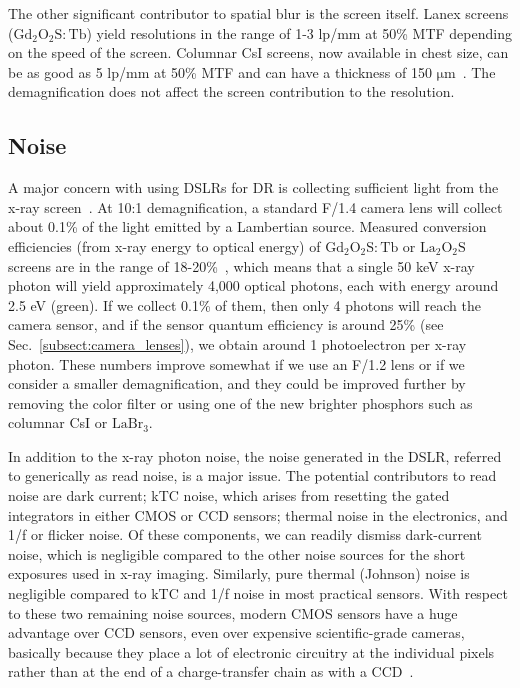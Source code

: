 The other significant contributor to spatial blur is the screen itself. Lanex screens ($\mathrm{Gd_2O_2S:Tb}$) yield resolutions in the range of 1-3 lp/mm at 50\% MTF depending on the speed of the screen. Columnar CsI screens, now available in chest size, can be as good as 5 lp/mm at 50\% MTF and can have a thickness of 150 $\mathrm{\mu m}$~\citep{Nagarkar1997}. The demagnification does not affect the screen contribution to the resolution.

\subsection{Noise}
\label{subsect:noise}
A major concern with using DSLRs for DR is collecting sufficient light from the x-ray screen~\citep{Hejazi1997}. At 10:1 demagnification, a standard F/1.4 camera lens will collect about 0.1\% of the light emitted by a Lambertian source. Measured conversion efficiencies (from x-ray energy to optical energy) of $\mathrm{Gd_2O_2S:Tb}$ or $\mathrm{La_2O_2S}$ screens are in the range of 18-20\%~\citep{Kandarakis2001}, which means that a single 50 keV x-ray photon will yield approximately 4,000 optical photons, each with energy around 2.5 eV (green). If we collect 0.1\% of them, then only 4 photons will reach the camera sensor, and if the sensor quantum efficiency is around 25\% (see Sec.~\ref{subsect:camera_lenses}), we obtain around 1 photoelectron per x-ray photon. These numbers improve somewhat if we use an F/1.2 lens or if we consider a smaller demagnification, and they could be improved further by removing the color filter or using one of the new brighter phosphors such as columnar CsI or $\mathrm{LaBr_3}$.

In addition to the x-ray photon noise, the noise generated in the DSLR, referred to generically as read noise, is a major issue. The potential contributors to read noise are dark current; kTC noise, which arises from resetting the gated integrators in either CMOS or CCD sensors; thermal noise in the electronics, and 1/f or flicker noise. Of these components, we can readily dismiss dark-current noise, which is negligible compared to the other noise sources for the short exposures used in x-ray imaging. Similarly, pure thermal (Johnson) noise is negligible compared to kTC and 1/f noise in most practical sensors. With respect to these two remaining noise sources, modern CMOS sensors have a huge advantage over CCD sensors, even over expensive scientific-grade cameras, basically because they place a lot of electronic circuitry at the individual pixels rather than at the end of a charge-transfer chain as with a CCD~\citep{Magnan2003}.

